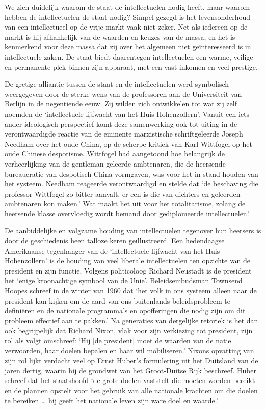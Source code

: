 \documentclass[
  a5paper,
  smalldemyvopaper,10pt,twoside,onecolumn,openright,extrafontsizes,hidelinks]{memoir}
\begin{document}
We zien duidelijk waarom de staat de intellectuelen nodig heeft, maar
waarom hebben de intellectuelen de staat nodig? Simpel gezegd is het
levensonderhoud van een intellectueel op de vrije markt vaak niet zeker.
Net als iedereen op de markt is hij afhankelijk van de waarden en keuzes
van de massa, en het is kenmerkend voor deze massa dat zij over het
algemeen niet geïnteresseerd is in intellectuele zaken. De staat biedt
daarentegen intellectuelen een warme, veilige en permanente plek binnen
zijn apparaat, met een vast inkomen en veel prestige.

De gretige alliantie tussen de staat en de intellectuelen werd
symbolisch weergegeven door de sterke wens van de professoren aan de
Universiteit van Berlijn in de negentiende eeuw. Zij wilden zich
ontwikkelen tot wat zij zelf noemden de `intellectuele lijfwacht van het
Huis Hohenzollern'. Vanuit een iets ander ideologisch perspectief komt
deze samenwerking ook tot uiting in de verontwaardigde reactie van de
eminente marxistische schriftgeleerde Joseph Needham over het oude
China, op de scherpe kritiek van Karl Wittfogel op het oude Chinese
despotisme. Wittfogel had aangetoond hoe belangrijk de verheerlijking
van de gentleman-geleerde ambtenaren, die de heersende bureaucratie van
despotisch China vormgaven, was voor het in stand houden van het
systeem. Needham reageerde verontwaardigd en stelde dat `de beschaving
die professor Wittfogel zo bitter aanvalt, er een is die van dichters en
geleerden ambtenaren kon maken.' Wat maakt het uit voor het
totalitarisme, zolang de heersende klasse overvloedig wordt bemand door
gediplomeerde intellectuelen!

De aanbiddelijke en volgzame houding van intellectuelen tegenover hun
heersers is door de geschiedenis heen talloze keren geïllustreerd. Een
hedendaagse Amerikaanse tegenhanger van de `intellectuele lijfwacht van
het Huis Hohenzollern' is de houding van veel liberale intellectuelen
ten opzichte van de president en zijn functie. Volgens politicoloog
Richard Neustadt is de president het `enige kroonachtige symbool van de
Unie'. Beleidsembudsman Townsend Hoopes schreef in de winter van 1960
dat `het volk in ons systeem alleen naar de president kan kijken om de
aard van ons buitenlands beleidsprobleem te definiëren en de nationale
programma's en opofferingen die nodig zijn om dit probleem effectief aan
te pakken.' Na generaties van dergelijke retoriek is het dan ook
begrijpelijk dat Richard Nixon, vlak voor zijn verkiezing tot president,
zijn rol als volgt omschreef: `Hij {[}de president{]} moet de waarden
van de natie verwoorden, haar doelen bepalen en haar wil mobiliseren.'
Nixons opvatting van zijn rol lijkt verdacht veel op Ernst Huber's
formulering uit het Duitsland van de jaren dertig, waarin hij de
grondwet van het Groot-Duitse Rijk beschreef. Huber schreef dat het
staatshoofd `de grote doelen vaststelt die moeten worden bereikt en de
plannen opstelt voor het gebruik van alle nationale krachten om die
doelen te bereiken \ldots{} hij geeft het nationale leven zijn ware doel
en waarde.'
\end{document}
